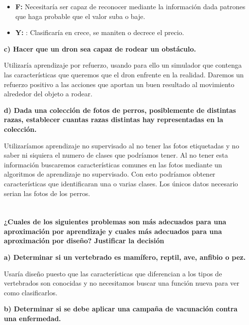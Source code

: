 \documentclass[titlepage]{article}
\begin{document}
		\begin{itemize}
			\item \textbf{F: } Necesitaría ser capaz de reconocer mediante la información dada patrones que haga probable que el valor suba o baje.
			\item \textbf{Y: }: Clasificaría en crece, se maniten o decrece el precio.
		\end{itemize}
		
		\textbf{c) Hacer que un dron sea capaz de rodear un obstáculo.}
		\newline
		
		Utilizaría aprendizaje por refuerzo, usando para ello un simulador que contenga las características que queremos que el dron enfrente en la realidad. Daremos un refuerzo positivo a las acciones que aportan un buen resultado al movimiento alrededor del objeto a rodear.
		\newline
		
		\textbf{d) Dada una colección de fotos de perros, posiblemente de distintas razas, establecer
		cuantas razas distintas hay representadas en la colección.}
		\newline
		
		Utilizaríamos aprendizaje no supervisado al no tener las fotos etiquetadas y no saber ni siquiera el numero de clases que podríamos tener. Al no tener esta información buscaremos características comunes en las fotos mediante un algoritmos de aprendizaje no supervisado. Con esto podríamos obtener características que identificaran una o varias clases.
		Los únicos datos necesario serian las fotos de los perros.
	\newpage
	\section{}
	\textbf{¿Cuales de los siguientes problemas son más adecuados para una aproximación por aprendizaje y cuales más adecuados para una aproximación por diseño? Justificar la decisión}
	\newline
	
	\textbf{a) Determinar si un vertebrado es mamífero, reptil, ave, anfibio o pez.}	
	
	Usaría diseño puesto que las características que diferencian a los tipos de vertebrados son conocidas y no necesitamos buscar una función nueva para ver como clasificarlos.	
	\newline
	
	\textbf{b) Determinar si se debe aplicar una campaña de vacunación contra una enfermedad.}
	
\end{document}
